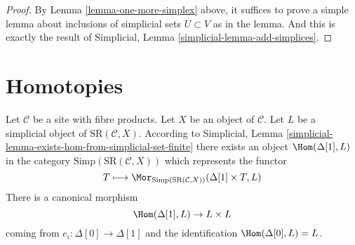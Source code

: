 \begin{proof}
By Lemma \ref{lemma-one-more-simplex}
above, it suffices to prove a simple lemma
about inclusions of simplicial sets $U \subset V$ as in the
lemma. And this is exactly the result of
Simplicial, Lemma \ref{simplicial-lemma-add-simplices}.
\end{proof}




\section{Homotopies}
\label{section-homotopies}

\noindent
Let $\mathcal{C}$ be a site with fibre products.
Let $X$ be an object of $\mathcal{C}$.
Let $L$ be a simplicial object of $\text{SR}(\mathcal{C}, X)$.
According to
Simplicial, Lemma \ref{simplicial-lemma-exists-hom-from-simplicial-set-finite}
there exists an object $\Hom(\Delta[1], L)$
in the category $\text{Simp}(\text{SR}(\mathcal{C}, X))$ which represents the
functor
$$
T
\longmapsto
\Mor_{\text{Simp}(\text{SR}(\mathcal{C}, X))}(\Delta[1] \times T, L)
$$
There is a canonical morphism
$$
\Hom(\Delta[1], L) \to L \times L
$$
coming from $e_i : \Delta[0] \to \Delta[1]$ and the identification
$\Hom(\Delta[0], L) = L$.

